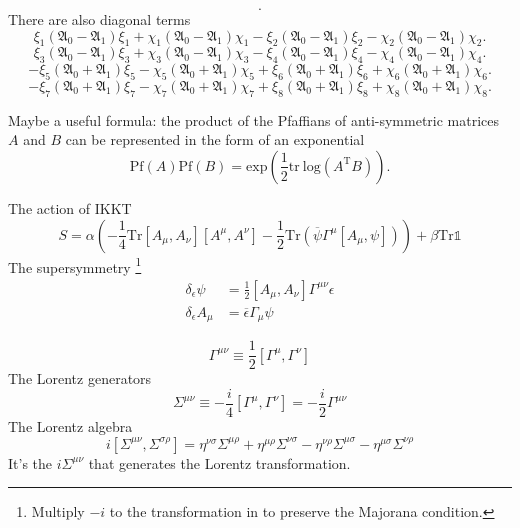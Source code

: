 \begin{correct}
\[.\] 
There are also diagonal terms
\[
\xi_1 (\mathfrak{A}_0 - \mathfrak{A}_1) \xi_1 + \chi_1 (\mathfrak{A}_0 - \mathfrak{A}_1) \chi_1
-\xi_2 (\mathfrak{A}_0 - \mathfrak{A}_1) \xi_2 - \chi_2 (\mathfrak{A}_0 - \mathfrak{A}_1) \chi_2
.\] 
\[
\xi_3 (\mathfrak{A}_0 - \mathfrak{A}_1) \xi_3 + \chi_3 (\mathfrak{A}_0 - \mathfrak{A}_1) \chi_3
-\xi_4 (\mathfrak{A}_0 - \mathfrak{A}_1) \xi_4 - \chi_4 (\mathfrak{A}_0 - \mathfrak{A}_1) \chi_4
.\] 
\[
-\xi_5 (\mathfrak{A}_0 + \mathfrak{A}_1) \xi_5 - \chi_5 (\mathfrak{A}_0 + \mathfrak{A}_1) \chi_5
+\xi_6 (\mathfrak{A}_0 + \mathfrak{A}_1) \xi_6 + \chi_6 (\mathfrak{A}_0 + \mathfrak{A}_1) \chi_6
.\] 
\[
-\xi_7 (\mathfrak{A}_0 + \mathfrak{A}_1) \xi_7 - \chi_7 (\mathfrak{A}_0 + \mathfrak{A}_1) \chi_7
+\xi_8 (\mathfrak{A}_0 + \mathfrak{A}_1) \xi_8 + \chi_8 (\mathfrak{A}_0 + \mathfrak{A}_1) \chi_8
.\] 
\end{correct}

Maybe a useful formula:
the product of the Pfaffians of anti-symmetric matrices $A$ and $B$
can be represented in the form of an exponential
\[
	\mathrm{Pf}(A) \mathrm{Pf}(B) = \mathrm{exp} \left( \frac{1}{2}
	\mathrm{tr} ~ \mathrm{log} (A^{\text{T} }B)\right) 
.\] 

\newpage
The action of IKKT
\begin{equation}
	S = \alpha \left( -\frac{1}{4} \mathrm{Tr} [A_\mu,A_\nu][A^\mu,A^\nu]
	- \frac{1}{2} \mathrm{Tr}(\overline{\psi}\Gamma^\mu [A_\mu,\psi])\right) 
	+\beta \mathrm{Tr}\mathds{1}
\end{equation}
The supersymmetry \footnote{Multiply $-i$ to the transformation in  to preserve the Majorana condition.}
\begin{align}
	\label{susy-1}
	\delta_{\epsilon}\psi &= \frac{1}{2} [A_\mu,A_\nu] \Gamma^{\mu\nu} \epsilon\\
	\delta_\epsilon A_\mu &=  \overline{\epsilon} \Gamma_\mu \psi
\end{align}

\begin{info}
	\begin{equation}
		\Gamma^{\mu\nu} \equiv \frac{1}{2} [\Gamma^\mu,\Gamma^\nu]
	\end{equation}
	The Lorentz generators
	\begin{equation}
		\Sigma^{\mu\nu} \equiv - \frac{i}{4} [\Gamma^\mu,\Gamma^\nu]
		= - \frac{i}{2} \Gamma^{\mu\nu}
	\end{equation}
The Lorentz algebra	
	\begin{equation}
		i [\Sigma^{\mu\nu},\Sigma^{\sigma \rho}]
		= \eta^{\nu\sigma} \Sigma^{\mu\rho}
		+ \eta^{\mu\rho} \Sigma^{\nu\sigma}
		- \eta^{\nu\rho}\Sigma^{\mu\sigma}
		- \eta^{\mu\sigma} \Sigma^{\nu\rho}
	\end{equation}
	It's the $i \Sigma^{\mu\nu}$ that generates the Lorentz transformation.
\end{info}

